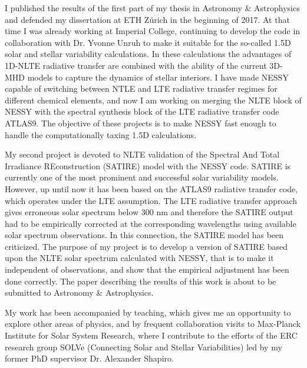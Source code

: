 \documentclass[11pt, a4paper]{awesome-cv}
\begin{document}
\begin{cvletter}
I published the results of the first part of my thesis in Astronomy \& Astrophysics 
and defended my dissertation at ETH Z{\"u}rich in the beginning of 2017.
At that time I was already working at Imperial College, continuing to develop
the code in collaboration with Dr. Yvonne Unruh to make it suitable
for the so-called 1.5D solar and stellar variability calculations. 
In these calculations the advantages of 1D-NLTE radiative transfer are
combined with the ability of the current 3D-MHD models to capture the dynamics of stellar interiors.
I have made NESSY capable of switching between NTLE and LTE radiative transfer regimes for different chemical elements,
and now I am working on merging the NLTE block of NESSY with the spectral synthesis block of the LTE radiative transfer code ATLAS9.
The objective of these projects is to make NESSY fast enough to handle the computationally taxing 1.5D calculations.

My second project is devoted to NLTE validation of the Spectral And Total Irradiance REconstruction (SATIRE)
model with the NESSY code.
SATIRE is currently one of the most prominent and successful solar variability models.
However, up until now it has been based on the ATLAS9 radiative transfer code, which operates under the LTE assumption.
The LTE radiative transfer approach gives erroneous solar spectrum below 300 nm and therefore the SATIRE output had to be
empirically corrected at the corresponding wavelengths using available solar spectrum observations.
In this connection, the SATIRE model has been criticized.
The purpose of my project is to develop a version of SATIRE based upon the NLTE solar spectrum calculated with NESSY,
that is to make it independent of observations, and show that the empirical adjustment has been done correctly.
The paper describing the results of this work is about to be submitted to Astronomy \& Astrophysics.

My work has been accompanied by teaching, which gives me an opportunity to explore other areas of physics,
and by frequent collaboration visits to Max-Planck Institute for Solar System Research,
where I contribute to the efforts of the ERC research group SOLVe (Connecting Solar and Stellar Variabilities)
led by my former PhD supervisor Dr. Alexander Shapiro.


\end{cvletter}
\end{document}
